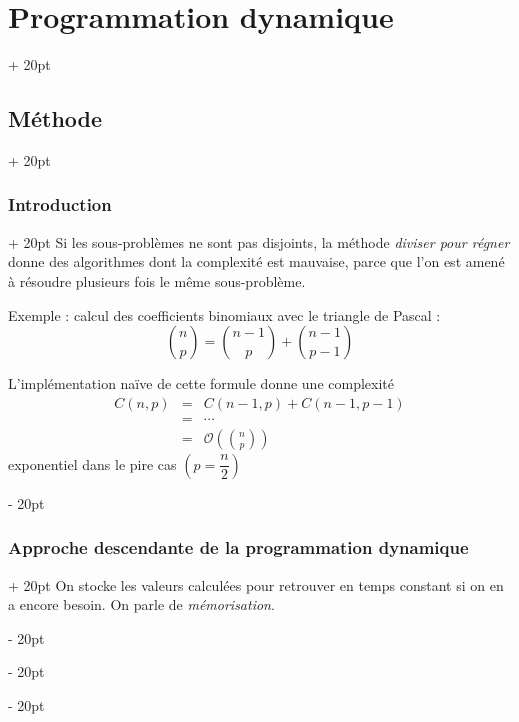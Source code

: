\documentclass[a4paper, 12pt, twoside]{article}
\newcommand{\lr}[1]{\left( #1 \right)}
\newcommand{\ind}[1][20pt]{\advance\leftskip + #1}
\newcommand{\deind}[1][20pt]{\advance\leftskip - #1}
\newenvironment{indt}[2][20pt]{#2 \par \ind[#1]}{\par \deind} %
\begin{document}
    \vspace{12pt}
    
    \begin{indt}{\section{Programmation dynamique}}
        
        \begin{indt}{\subsection{Méthode}}
            \begin{indt}{\subsubsection{Introduction}}
                Si les sous-problèmes ne sont pas disjoints, la méthode \textit{diviser pour régner} donne des algorithmes dont la complexité est mauvaise, parce que l'on est amené à résoudre plusieurs fois le même sous-problème.
                
                \vspace{6pt}
                
                Exemple : calcul des coefficients binomiaux avec le triangle de Pascal :
                    \[ \binom n p = \binom{n - 1}{p} + \binom{n - 1}{p - 1} \]
                
                L'implémentation naïve de cette formule donne une complexité
                    \[
                        \begin{array}{rcl}
                            C(n, p) &=& C(n - 1, p) + C(n - 1, p - 1)
                            \\
                            &=& \cdots
                            \\
                            &=& \displaystyle \mathcal O\lr{\binom n p}
                        \end{array}
                    \]
                exponentiel dans le pire cas $\lr{p = \dfrac n 2}$
            \end{indt}
            
            \vspace{12pt}
            
            \begin{indt}{\subsubsection{Approche descendante de la programmation dynamique}}
                On stocke les valeurs calculées pour retrouver en temps constant si on en a encore besoin. On parle de \textit{mémorisation}.
                

\end{indt}
\end{indt}
\end{indt}
\end{document}
